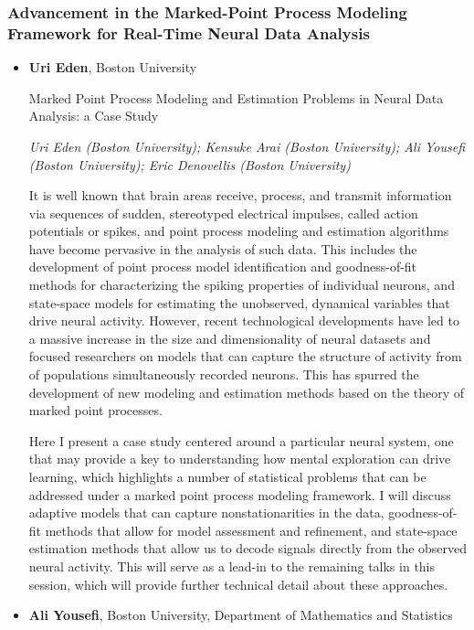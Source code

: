 \subsubsection*{Advancement in the Marked-Point Process Modeling Framework for Real-Time Neural Data Analysis}

\begin{itemize}
\item \textbf{Uri Eden}, Boston University

Marked Point Process Modeling and Estimation Problems in Neural Data Analysis: a Case Study

\emph{\footnotesize Uri Eden (Boston University); Kensuke Arai (Boston University); Ali Yousefi (Boston University); Eric Denovellis (Boston University)}

It is well known that brain areas receive, process, and transmit information via sequences of sudden, stereotyped electrical impulses, called action potentials or spikes, and point process modeling and estimation algorithms have become pervasive in the analysis of such data. This includes the development of point process model identification and goodness-of-fit methods for characterizing the spiking properties of individual neurons, and state-space models for estimating the unobserved, dynamical variables that drive neural activity. However, recent technological developments have led to a massive increase in the size and dimensionality of neural datasets and focused researchers on models that can capture the structure of activity from of populations simultaneously recorded neurons. This has spurred the development of new modeling and estimation methods based on the theory of marked point processes. 

Here I present a case study centered around a particular neural system, one that may provide a key to understanding how mental exploration can drive learning, which highlights a number of statistical problems that can be addressed under a marked point process modeling framework. I will discuss adaptive models that can capture nonstationarities in the data, goodness-of-fit methods that allow for model assessment and refinement, and state-space estimation methods that allow us to decode signals directly from the observed neural activity. This will serve as a lead-in to the remaining talks in this session, which will provide further technical detail about these approaches.

\item \textbf{Ali Yousefi}, Boston University, Department of Mathematics and Statistics


\end{itemize}
